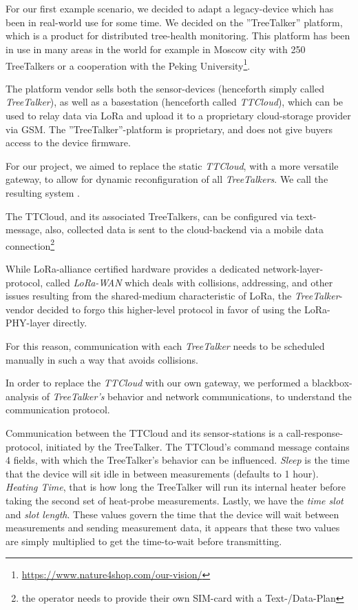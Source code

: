 \section{\ttt}
\label{sec:TreeTalker}

For our first example scenario, we decided to adapt a legacy-device which has been in real-world use for some time.
We decided on the ''TreeTalker'' platform, which is a product for distributed tree-health monitoring.
This platform has been in use in many areas in the world for example in Moscow city with 250 TreeTalkers or a cooperation with the Peking University\footnote{\url{https://www.nature4shop.com/our-vision/}}.

The platform vendor sells both the sensor-devices (henceforth simply called \textit{TreeTalker}), as well as a basestation (henceforth called \textit{TTCloud}), which can be used to relay data via LoRa and upload it to a proprietary cloud-storage provider via GSM.
The ''TreeTalker''-platform is proprietary, and does not give buyers access to the device firmware.

For our project, we aimed to replace the static \textit{TTCloud}, with a more versatile gateway, to allow for dynamic reconfiguration of all \textit{TreeTalkers}.
We call the resulting system \ttt.

The TTCloud, and its associated TreeTalkers, can be configured via text-message, also, collected data is sent to the cloud-backend via a mobile data connection\footnote{the operator needs to provide their own SIM-card with a Text-/Data-Plan}

While LoRa-alliance certified hardware provides a dedicated network-layer-protocol, called \textit{LoRa-WAN} which deals with collisions, addressing, and other issues resulting from the shared-medium characteristic of LoRa, the \textit{TreeTalker}-vendor decided to forgo this higher-level protocol in favor of using the LoRa-PHY-layer directly.

For this reason, communication with each \textit{TreeTalker} needs to be scheduled manually in such a way that avoids collisions.

In order to replace the \textit{TTCloud} with our own gateway, we performed a blackbox-analysis of \textit{TreeTalker's} behavior and network communications, to understand the communication protocol.

Communication between the TTCloud and its sensor-stations is a call-response-protocol, initiated by the TreeTalker.
The TTCloud's command message contains 4 fields, with which the TreeTalker's behavior can be influenced.
\textit{Sleep} is the time that the device will sit idle in between measurements (defaults to 1 hour).
\textit{Heating Time}, that is how long the TreeTalker will run its internal heater before taking the second set of heat-probe measurements.
Lastly, we have the \textit{time slot} and \textit{slot length}.
These values govern the time that the device will wait between measurements and sending measurement data, it appears that these two values are simply multiplied to get the time-to-wait before transmitting.

